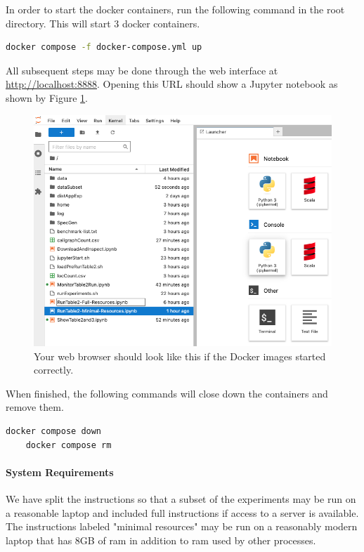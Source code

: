 \documentclass{acmart} %
\begin{document}
In order to start the docker containers, run the following command in the root directory.  This will start 3 docker containers.

\begin{lstlisting}[language=bash]
 docker compose -f docker-compose.yml up
\end{lstlisting}

All subsequent steps may be done through the web interface at \url{http://localhost:8888}.  Opening this URL should show a Jupyter notebook as shown by Figure \ref{fig:jupyter}.  


\begin{figure}[H]
    \includegraphics*[scale=0.35]{jupyter.png}
    \caption{Your web browser should look like this if the Docker images started correctly.}
    \label{fig:jupyter}
\end{figure}

When finished, the following commands will close down the containers and remove them.

\begin{lstlisting}[language=bash]
    docker compose down
    docker compose rm
\end{lstlisting}

\paragraph{System Requirements} 
We have split the instructions so that a subset of the experiments may be run on a reasonable laptop and included full instructions if access to a server is available.
The instructions labeled "minimal resources" may be run on a reasonably modern laptop that has 8GB of ram in addition to ram used by other processes. 
\end{document}

